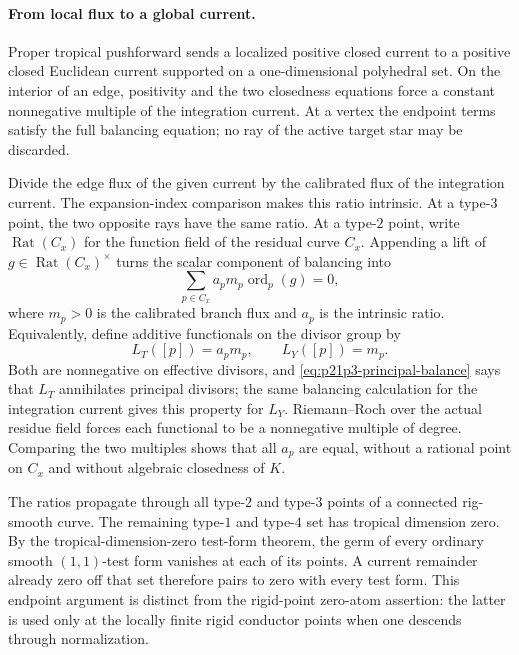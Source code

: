 
\paragraph{From local flux to a global current.}
Proper tropical pushforward sends a localized positive closed current to a
positive closed Euclidean current supported on a one-dimensional polyhedral
set.  On the interior of an edge, positivity and the two closedness equations
force a constant nonnegative multiple of the integration current.  At a
vertex the endpoint terms satisfy the full balancing equation; no ray of the
active target star may be discarded.

Divide the edge flux of the given current by the calibrated flux of the
integration current.  The expansion-index comparison makes this ratio
intrinsic.  At a type-\(3\) point, the two opposite rays have the same ratio.
At a type-\(2\) point, write \(\operatorname{Rat}(C_x)\) for the function
field of the residual curve \(C_x\).  Appending a lift of
\(g\in\operatorname{Rat}(C_x)^\times\) turns the scalar component of
balancing into
\begin{equation}
        \sum_{p\in C_x} a_p m_p\operatorname{ord}_p(g)=0,
 \label{eq:p21p3-principal-balance}
\end{equation}
where \(m_p>0\) is the calibrated branch flux and \(a_p\) is the intrinsic
ratio.  Equivalently, define additive functionals on the divisor group by
\[
                        L_T([p])=a_pm_p,
                        \qquad L_Y([p])=m_p.
\]
Both are nonnegative on effective divisors, and
\eqref{eq:p21p3-principal-balance} says that \(L_T\) annihilates principal
divisors; the same balancing calculation for the integration current gives
this property for \(L_Y\).  Riemann--Roch over the actual residue field
forces each functional to be a nonnegative multiple of degree.  Comparing
the two multiples shows that all \(a_p\) are equal, without a rational point
on \(C_x\) and without algebraic closedness of \(K\).

The ratios propagate through all type-\(2\) and type-\(3\) points of a
connected rig-smooth curve.  The remaining type-\(1\) and type-\(4\) set has
tropical dimension zero.  By the tropical-dimension-zero test-form theorem,
the germ of every ordinary smooth \((1,1)\)-test form vanishes at each of
its points.  A current remainder already zero off that set therefore pairs
to zero with every test form.  This endpoint argument is distinct from the
rigid-point zero-atom assertion: the latter is used only at the locally
finite rigid conductor points when one descends through normalization.

